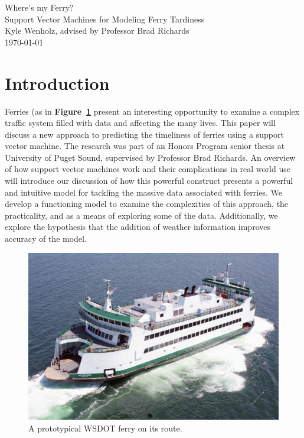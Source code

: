 \documentclass[11pt]{article} %
\begin{document}
\begin{titlepage}
    \vspace*{\fill}
    \begin{center}
      \Huge{Where's my Ferry?}\\[0.5cm]
      \Large{Support Vector Machines for Modeling Ferry Tardiness}\\[0.4cm]
      Kyle Wenholz, advised by Professor Brad Richards\\
      \today
    \end{center}
    \vspace*{\fill}
  \end{titlepage}
\newpage
\vspace*{\fill}
\tableofcontents
\vspace*{\fill}
\newpage

\section{Introduction}
\label{sec:intro}
Ferries (as in \textbf{Figure~\ref{fig:basicferry}} present an interesting 
opportunity to examine a complex traffic system filled with data and affecting 
the many lives. This paper will discuss a new approach to predicting 
the timeliness of ferries using a support vector machine. The research was part
of an Honors Program senior thesis at University of Puget Sound, supervised by 
Professor Brad Richards. An overview of how 
support vector machines work and their complications in real world use will 
introduce our discussion of how this powerful construct presents a powerful and 
intuitive model for tackling the massive data associated with ferries. We
develop a functioning model to examine the complexities of this
approach, the practicality, and as a means of exploring some of the data. 
Additionally, we explore the hypothesis that the addition of weather information 
improves accuracy of the model.

\begin{figure}[h]
  \centering
  \includegraphics[scale=.15]{images/ferry.jpg}
  \caption{A prototypical WSDOT ferry on its route.}
  \label{fig:basicferry}
\end{figure}
\end{document}
